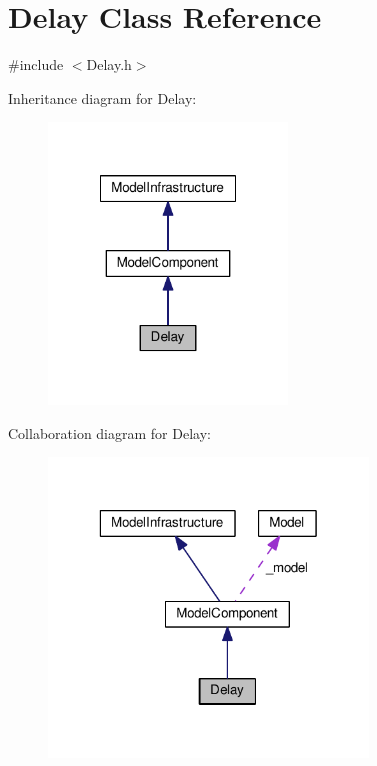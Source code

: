 \hypertarget{class_delay}{\section{Delay Class Reference}
\label{class_delay}
}


{\ttfamily \#include $<$Delay.\-h$>$}



Inheritance diagram for Delay\-:\nopagebreak
\begin{figure}[H]
\begin{center}
\leavevmode
\includegraphics[width=180pt]{class_delay__inherit__graph}
\end{center}
\end{figure}


Collaboration diagram for Delay\-:\nopagebreak
\begin{figure}[H]
\begin{center}
\leavevmode
\includegraphics[width=241pt]{class_delay__coll__graph}
\end{center}
\end{figure}
